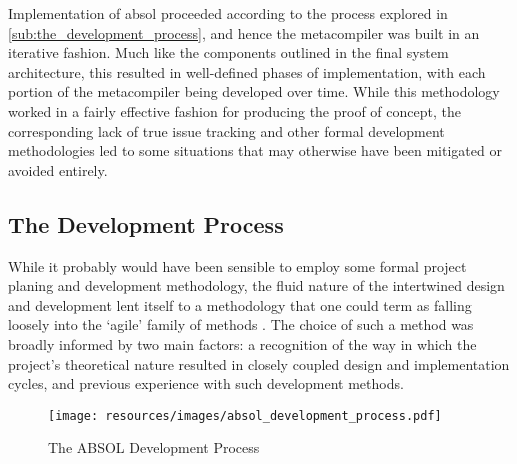 Implementation of \gls{absol} proceeded according to the process explored in \autoref{sub:the_development_process}, and hence the metacompiler was built in an iterative fashion.
Much like the components outlined in the final system architecture, this resulted in well-defined phases of implementation, with each portion of the metacompiler being developed over time. 
While this methodology worked in a fairly effective fashion for producing the proof of concept, the corresponding lack of true issue tracking and other formal development methodologies led to some situations that may otherwise have been mitigated or avoided entirely.

\subsection{The Development Process} %
\label{sub:the_development_process}
While it probably would have been sensible to employ some formal project planing and development methodology, the fluid nature of the intertwined design and development lent itself to a methodology that one could term as falling loosely into the `agile' family of methods \citep{fowler2001agile}.
The choice of such a method was broadly informed by two main factors: a recognition of the way in which the project's theoretical nature resulted in closely coupled design and implementation cycles, and previous experience with such development methods.\\

\begin{figure}[!htb]
    \centering
    \texttt{[image: resources/images/absol\_development\_process.pdf]}
    \caption{The ABSOL Development Process}
    \label{fig:the_absol_development_process}
\end{figure}

